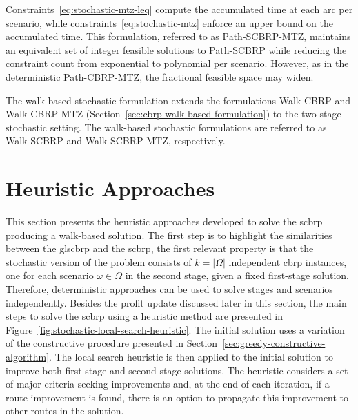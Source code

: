 Constraints~\eqref{eq:stochastic-mtz-leq} compute the accumulated time at each
arc per scenario, while constraints~\eqref{eq:stochastic-mtz} enforce an upper
bound on the accumulated time. This formulation, referred to as Path-SCBRP-MTZ,
maintains an equivalent set of integer feasible solutions to Path-SCBRP while
reducing the constraint count from exponential to polynomial per scenario.
However, as in the deterministic Path-CBRP-MTZ, the fractional feasible space
may widen.

The walk-based stochastic formulation extends the formulations Walk-CBRP and Walk-CBRP-MTZ (Section~\ref{sec:cbrp-walk-based-formulation}) to the two-stage stochastic setting. The walk-based stochastic formulations are referred to as Walk-SCBRP and Walk-SCBRP-MTZ, respectively.

\section{Heuristic Approaches}\label{sec:heuristic-approaches}

This section presents the heuristic approaches developed to solve the \gls{scbrp} producing a walk-based solution. 
The first step is to highlight the similarities between the gls{cbrp} and the \gls{scbrp}, the first relevant property is that the stochastic version of the problem consists of $k = |\Omega|$ independent \gls{cbrp} instances, one for each scenario $\omega \in \Omega$ in the second stage, given a fixed first-stage solution. 
Therefore, deterministic approaches can be used to solve stages and scenarios independently. Besides the profit update discussed later in this section, the main steps to solve the \gls{scbrp} using a heuristic method are presented in Figure~\ref{fig:stochastic-local-search-heuristic}. The initial solution uses a variation of the constructive procedure presented in Section~\ref{sec:greedy-constructive-algorithm}. The local search heuristic is then applied to the initial solution to improve both first-stage and second-stage solutions. 
The heuristic considers a set of major criteria seeking improvements and, at the end of each iteration, if a route improvement is found, there is an option to propagate this improvement to other routes in the solution.

